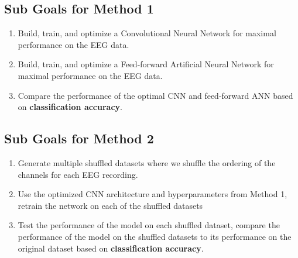 \documentclass[11pt]{article}
\begin{document}
\vspace{2mm}
    
\subsection{Sub Goals for Method 1}
\begin{enumerate}
    \item Build, train, and optimize a Convolutional Neural Network for maximal performance on the EEG data.
    \item Build, train, and optimize a Feed-forward Artificial Neural Network for maximal performance on the EEG data.
    \item Compare the performance of the optimal CNN and feed-forward ANN based on \textbf{classification accuracy}.
\end{enumerate}


    


\subsection{Sub Goals for Method 2}
\begin{enumerate}
    \item Generate multiple shuffled datasets where we shuffle the ordering of the channels for each EEG recording.
    \item Use the optimized CNN architecture and hyperparameters from Method 1, retrain the network on each of the shuffled datasets
    \item Test the performance of the model on each shuffled dataset, compare the performance of the model on the shuffled datasets to its performance on the original dataset based on \textbf{classification accuracy}.
\end{enumerate}

    
    
\end{document}
